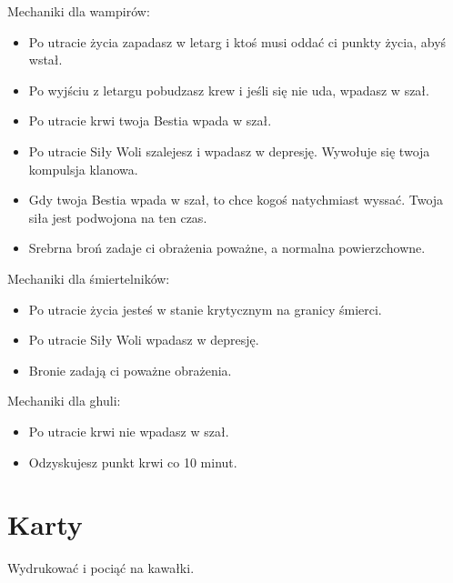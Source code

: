 	Mechaniki dla wampirów:
	\begin{itemize}
		\item Po utracie życia zapadasz w letarg i ktoś musi oddać ci punkty życia, abyś wstał.
		\item Po wyjściu z letargu pobudzasz krew i jeśli się nie uda, wpadasz w szał.
		\item Po utracie krwi twoja Bestia wpada w szał.
		\item Po utracie Siły Woli szalejesz i wpadasz w depresję. Wywołuje się twoja kompulsja klanowa.
		\item Gdy twoja Bestia wpada w szał, to chce kogoś natychmiast wyssać. Twoja siła jest podwojona na ten czas.
		\item Srebrna broń zadaje ci obrażenia poważne, a normalna powierzchowne.
	\end{itemize}

	Mechaniki dla śmiertelników:
	\begin{itemize}
		\item Po utracie życia jesteś w stanie krytycznym na granicy śmierci.
		\item Po utracie Siły Woli wpadasz w depresję.
		\item Bronie zadają ci poważne obrażenia.
	\end{itemize}

	Mechaniki dla ghuli:
	\begin{itemize}
		\item Po utracie krwi nie wpadasz w szał.
		\item Odzyskujesz punkt krwi co 10 minut.
	\end{itemize}

		
\section{Karty}
	Wydrukować i pociąć na kawałki.
